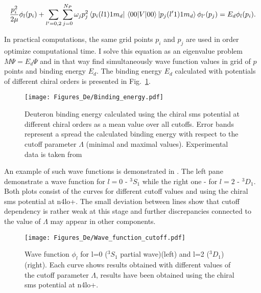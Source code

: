     
    \begin{equation}
        \frac{p_i^2}{2\mu} \phi_l(p_i) +
        \sum_{l^\prime =0,2}\sum_{j =0}^{N_P}  \omega_j p^{2}_j 
        \bra{p_i(l1)1m_d} \matrixel{00}{V}{00} \ket{p_j(l^\prime1)1m_d}
        \phi_{l^\prime}(p_j) = 
        E_d \phi_l(p_i).
        \label{integral2}
    \end{equation}

    In practical computations, the same grid points $p_i$ and $p_j$ are used in order
    optimize computational time. 
    I solve this equation as an eigenvalue problem $M\Psi = E_d \Psi$ and
    in that way
    find simultaneously wave function values in grid of $p$ points and binding energy $E_d$. 
    The binding energy $E_d$ calculated with potentials of different chiral orders 
    is presented in Fig.~\ref{bind}.

    \begin{figure}[h]
        \begin{center}
            \texttt{[image: Figures\_De/Binding\_energy.pdf]}
        \end{center}
        \caption{Deuteron binding energy calculated using the chiral \gls{sms} potential
        at different chiral orders as a mean value over all cutoffs.
        Error bands represent a spread the calculated binding energy with respect to
        the cutoff parameter $\Lambda$ (minimal and maximal values).
        Experimental data is taken from \cite{VANDERLEUN1982261}}
        \label{bind}
    \end{figure}

    An example of such wave functions is demonstrated in . The left pane demonstrate
    a wave function for $l=0$ - $^3S_1$ while the right one - for $l=2$ - $^3D_1$. Both 
    plots consist of the curves for different cutoff values and using the chiral \gls{sms} potential at \gls{n4lo+}.
    The small deviation between lines show that cutoff dependency is rather weak at this stage
    and further discrepancies connected to the value of $\Lambda$ may appear in other components.  

    \begin{figure}[h]
        \begin{center}
            \texttt{[image: Figures\_De/Wave\_function\_cutoff.pdf]}
        \end{center}
        \caption{Wave function $\phi_l$ for l=0 ($^3S_1$ partial wave)(left) and l=2 ($^3D_1$) (right).
        Each curve shows results obtained with different values of the cutoff parameter $\Lambda$, 
        results have been obtained using the chiral \gls{sms} potential at \gls{n4lo+}.}
        \label{wave_func}
    \end{figure}

